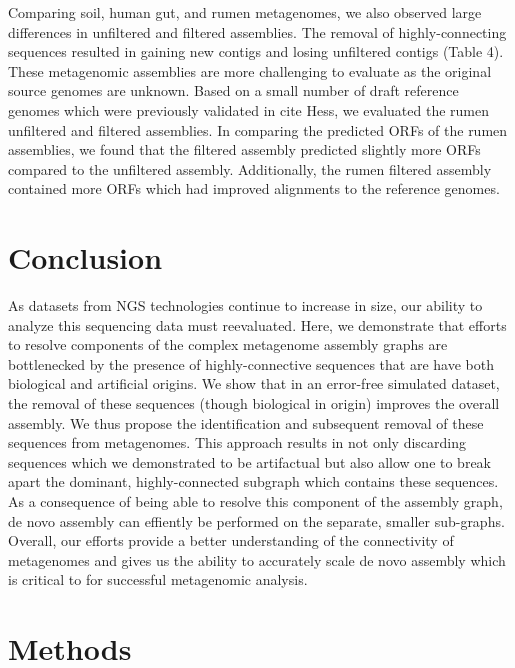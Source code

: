 \documentclass[11pt]{article} %
\begin{document}
Comparing soil, human gut, and rumen metagenomes, we also observed large differences in unfiltered and filtered assemblies.  The removal of highly-connecting sequences resulted in gaining new contigs and losing unfiltered contigs (Table 4).  These metagenomic assemblies are more challenging to evaluate as the original source genomes are unknown.  Based on a small number of draft reference genomes which were previously validated in cite Hess, we evaluated the rumen unfiltered and filtered assemblies.  In comparing the predicted ORFs of the rumen assemblies, we found that the filtered assembly predicted slightly more ORFs compared to the unfiltered assembly.  Additionally, the rumen filtered assembly contained more ORFs which had improved alignments to the reference genomes.  
	
\section{Conclusion}

As datasets from NGS technologies continue to increase in size, our ability to analyze this sequencing data must reevaluated.  Here, we demonstrate that efforts to resolve components of the complex metagenome assembly graphs are bottlenecked by the presence of highly-connective sequences that are have both biological and artificial origins.  We show that in an error-free simulated dataset, the removal of these sequences (though biological in origin) improves the overall assembly.  We thus propose the identification and subsequent removal of these sequences from metagenomes.  This approach results in not only discarding sequences which we demonstrated to be artifactual but also allow one to break apart the dominant, highly-connected subgraph which contains these sequences.  As a consequence of being able to resolve this component of the assembly graph, de novo assembly can effiently be performed on the separate, smaller sub-graphs.  Overall, our efforts provide a better understanding of the connectivity of metagenomes and gives us the ability to accurately scale de novo assembly which is critical to for successful metagenomic analysis.  



\section{Methods}
\end{document}
